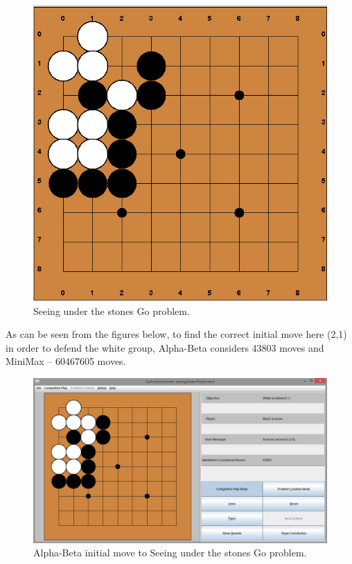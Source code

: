 \documentclass{l3proj}
\begin{document}
\begin{figure}[H]
\centering
\includegraphics[scale=0.5]{Images/UnderTheStones.png}
\caption{Seeing under the stones Go problem.}
\end{figure}

As can be seen from the figures below, to find the correct initial move here (2,1) in order to defend the white group, Alpha-Beta considers 43803 moves and MiniMax – 60467605 moves. 

\begin{figure}[H]
\centering
\includegraphics[scale=0.5]{Images/UnderTheStones_Alphabeta.png}
\caption{Alpha-Beta initial move to Seeing under the stones Go problem.}
\end{figure}
\end{document}
